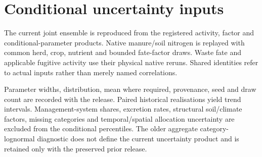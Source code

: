 \section{Conditional uncertainty inputs}
\label{app:unc}
The current joint ensemble is reproduced from the registered activity, factor and conditional-parameter products. Native manure/soil nitrogen is replayed with common herd, crop, nutrient and bounded fate-factor draws. Waste fate and applicable fugitive activity use their physical native reruns. Shared identities refer to actual inputs rather than merely named correlations.

Parameter widths, distribution, mean where required, provenance, seed and draw count are recorded with the release. Paired historical realisations yield trend intervals. Management-system shares, excretion rates, structural soil/climate factors, missing categories and temporal/spatial allocation uncertainty are excluded from the conditional percentiles. The older aggregate category-lognormal diagnostic does not define the current uncertainty product and is retained only with the preserved prior release.
